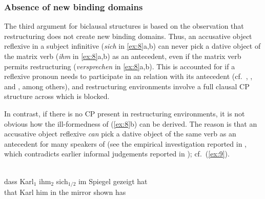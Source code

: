 \documentclass[output=paper]{langsci/langscibook}
\begin{document}
\subsubsection{\label{b3}Absence of new binding domains}

\largerpage[1]
The third argument for biclausal structures is based on the observation that
restructuring does not create new binding domains.  Thus, an accusative object
reflexive in a subject  infinitive ({\itshape sich} in \ref{ex:8}a,b) can
never pick a dative object of the matrix verb ({\itshape ihm} in \ref{ex:8}a,b) as
an antecedent, even if the matrix verb permits restructuring ({\itshape versprechen}
in \ref{ex:8}a,b). This is accounted for if a reflexive pronoun needs to
participate in an  relation with its antecedent (cf.\
\citealt{Reuland:01,Reuland:11}, \citealt{Fischer:04}, and \citealt{Hicks:09},
among others), and restructuring environments involve a full clausal CP
structure across which \isi{Agree} is blocked.

\ea\label{ex:8} 
    \z
\z

In contrast, if there is no CP present in restructuring environments, it is not
obvious how the ill-formedness of (\ref{ex:8}b) can be derived. The reason is
that an accusative\is{accusative case} object reflexive {\itshape can} pick a dative object of the same
verb as an antecedent for many speakers of \ili{German} (see the empirical
investigation reported in
\citealt{Sternefeld&Featherston:03,Featherston&Sternefeld:03}, which
contradicts earlier informal judgements reported in \citealt{Grewendorf:88});
cf.\ (\ref{ex:9}).

\ea\label{ex:9} \\
    \gll dass Karl$_1$  ihm$_2$   sich$_{1/2}$ im Spiegel gezeigt hat\\
        that Karl\textsubscript{\Nom}   him\textsubscript{\Dat}  \Refl{} {in the} mirror shown has\\
\z
\end{document}
